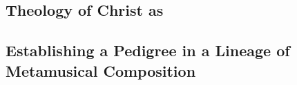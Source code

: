 \subsection{Theology of Christ as }




\subsection{Establishing a Pedigree in a Lineage of Metamusical Composition}

